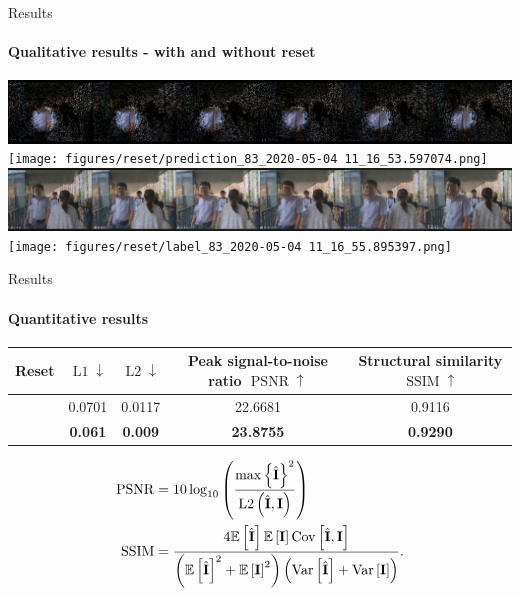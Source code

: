 \documentclass[
	ngerman,
	aspectratio=169,
	color={accentcolor=3d},
	logo=false,
	colorframetitle=true,
	]{tudabeamer}
\newcommand{\cmark}{\ding{51}}
\newcommand{\xmark}{\ding{55}}
\newcommand{\Tensor}[1]{\boldsymbol{\mathrm{\MakeUppercase{#1}}}}
\newcommand{\Mean}[1]{\mathbb{E}\left[#1\right]}
\newcommand{\Var}[1]{\mathrm{Var}\left[#1\right]}
\newcommand{\Cov}[1]{\mathrm{Cov}\left[#1\right]}
\begin{document}
\begin{frame}{Results}
    \framesubtitle{Qualitative results - with and without reset}
    \begin{center}
    \includegraphics[width=0.75\linewidth]{figures/reset/input_83_2020-05-04 11_16_57.840082.png}
    \texttt{[image: figures/reset/prediction\_83\_2020-05-04 11\_16\_53.597074.png]}
    \includegraphics[width=0.75\linewidth]{figures/no_rest/prediction_83_2020-05-06 09_56_17.234900.png}
    \texttt{[image: figures/reset/label\_83\_2020-05-04 11\_16\_55.895397.png]}
    \end{center}
\end{frame}


\begin{frame}{Results}
    \framesubtitle{Quantitative results}
    \begin{table}[!htbp]
    \centering
    \begin{center}
        \begin{tabular}{c|c|c|c|c}
            Reset & $\operatorname{L1}\downarrow$ & $\operatorname{L2}\downarrow$ & Peak signal-to-noise ratio $\operatorname{PSNR}\uparrow$ & Structural similarity $\operatorname{SSIM}\uparrow$ \\ 
            \hline 
            \cmark & 0.0701 & 0.0117 & 22.6681 & 0.9116 \\
            \xmark & {\bf 0.061} & {\bf 0.009} & {\bf 23.8755} & {\bf 0.9290} \\ 
            \hline 
        \end{tabular} 
    \end{center}
    \end{table}
    \begin{align*}
        \operatorname{PSNR}&=10 \log_{10}\left(\frac{\max\left\{\hat{\Tensor{I}}\right\}^2}{\operatorname{L2}\left(\hat{\Tensor{I}}, \Tensor{I}\right)} \right)\\
        \operatorname{SSIM}&=\frac{4\Mean{\hat{\Tensor{I}}}\Mean{\Tensor{I}}\Cov{\hat{\Tensor{I}}, \Tensor{I}}}{\left(\Mean{\hat{\Tensor{I}}}^2 + \Mean{\Tensor{I}}^2\right)\left(\Var{\hat{\Tensor{I}}} + \Var{\Tensor{I}}\right)}.
    \end{align*}
\end{frame}
\end{document}
